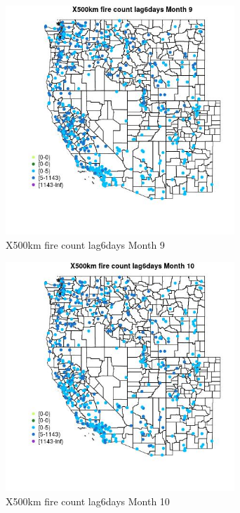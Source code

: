 \begin{figure} 
\centering  
\includegraphics[width=0.77\textwidth]{Code_Outputs/Report_ML_input_PM25_Step4_part_e_de_duplicated_aves_compiled_2019-05-14wNAs_MapObsMo9X500km_fire_count_lag6days.jpg} 
\caption{\label{fig:Report_ML_input_PM25_Step4_part_e_de_duplicated_aves_compiled_2019-05-14wNAsMapObsMo9X500km_fire_count_lag6days}X500km fire count lag6days Month 9} 
\end{figure} 
 

\begin{figure} 
\centering  
\includegraphics[width=0.77\textwidth]{Code_Outputs/Report_ML_input_PM25_Step4_part_e_de_duplicated_aves_compiled_2019-05-14wNAs_MapObsMo10X500km_fire_count_lag6days.jpg} 
\caption{\label{fig:Report_ML_input_PM25_Step4_part_e_de_duplicated_aves_compiled_2019-05-14wNAsMapObsMo10X500km_fire_count_lag6days}X500km fire count lag6days Month 10} 
\end{figure} 
 

